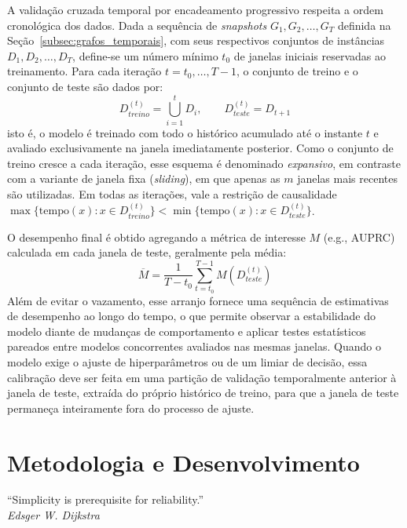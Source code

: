 \documentclass[titlepage,a4paper,oneside,onecolumn,12pt]{report}
\newenvironment{epigrafeonline}{\begin{flushright}\begin{minipage}{0.55\textwidth}}{\end{minipage}\end{flushright}}
\begin{document}
A validação cruzada temporal por encadeamento progressivo respeita a ordem cronológica dos dados. Dada a sequência de \textit{snapshots} $G_1, G_2, \ldots, G_T$ definida na Seção~\ref{subsec:grafos_temporais}, com seus respectivos conjuntos de instâncias $D_1, D_2, \ldots, D_T$, define-se um número mínimo $t_0$ de janelas iniciais reservadas ao treinamento. Para cada iteração $t = t_0, \ldots, T-1$, o conjunto de treino e o conjunto de teste são dados por:
\begin{equation}
    D_{treino}^{(t)} = \bigcup_{i=1}^{t} D_i, \qquad D_{teste}^{(t)} = D_{t+1}
\end{equation}
isto é, o modelo é treinado com todo o histórico acumulado até o instante $t$ e avaliado exclusivamente na janela imediatamente posterior. Como o conjunto de treino cresce a cada iteração, esse esquema é denominado \textit{expansivo}, em contraste com a variante de janela fixa (\textit{sliding}), em que apenas as $m$ janelas mais recentes são utilizadas. Em todas as iterações, vale a restrição de causalidade $\max\{\text{tempo}(x) : x \in D_{treino}^{(t)}\} < \min\{\text{tempo}(x) : x \in D_{teste}^{(t)}\}$.

O desempenho final é obtido agregando a métrica de interesse $M$ (e.g., AUPRC) calculada em cada janela de teste, geralmente pela média:
\begin{equation}
    \overline{M} = \frac{1}{T - t_0} \sum_{t=t_0}^{T-1} M\!\left(D_{teste}^{(t)}\right)
\end{equation}
Além de evitar o vazamento, esse arranjo fornece uma sequência de estimativas de desempenho ao longo do tempo, o que permite observar a estabilidade do modelo diante de mudanças de comportamento e aplicar testes estatísticos pareados entre modelos concorrentes avaliados nas mesmas janelas. Quando o modelo exige o ajuste de hiperparâmetros ou de um limiar de decisão, essa calibração deve ser feita em uma partição de validação temporalmente anterior à janela de teste, extraída do próprio histórico de treino, para que a janela de teste permaneça inteiramente fora do processo de ajuste.

\chapter{Metodologia e Desenvolvimento}
\label{cap:metodologia}

\begin{epigrafeonline}
\hfill ``Simplicity is prerequisite for reliability.''\hspace{0.2cm}\null\\
\hspace*{\fill}\textit{Edsger W. Dijkstra}\\
\end{epigrafeonline}
\end{document}
